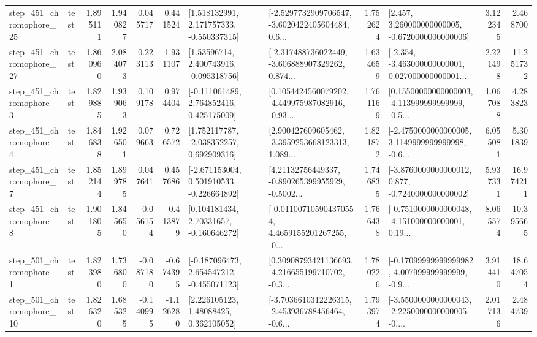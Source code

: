 \begin{tabular}{llrrrrllrlrr}
  step\_451\_chromophore\_25 &      test &      1.895111 &    1.940827 &      0.045717 &  0.441524 &    [1.518132991, 2.171757333, -0.550337315] &  [-2.5297732909706547, -3.6020422405604484, 0.6... &       1.752624 &    [2.457, 3.260000000000005, -0.6720000000000006] &            3.122345 &          2.468700 \\
  step\_451\_chromophore\_27 &      test &      1.860960 &    2.084073 &      0.223113 &  1.931107 &     [1.53596714, 2.400743916, -0.095318756] &  [-2.317488736022449, -3.606888907329262, 0.874... &       1.634659 &  [-2.354, -3.463000000000001, 0.027000000000001... &            2.221498 &         11.251732 \\
   step\_451\_chromophore\_3 &      test &      1.829885 &    1.939063 &      0.109178 &  0.974404 &    [-0.111061489, 2.764852416, 0.425175009] &  [0.1054424560079202, -4.449975987082916, -0.93... &       1.761169 &  [0.15500000000000003, -4.113999999999999, -0.5... &            1.067088 &          4.283823 \\
   step\_451\_chromophore\_4 &      test &      1.846838 &    1.926501 &      0.079663 &  0.726572 &    [1.752117787, -2.038352257, 0.692909316] &  [2.900427609605462, -3.3959253668123313, 1.089... &       1.821872 &  [-2.4750000000000005, 3.1149999999999998, -0.6... &            6.055081 &          5.301839 \\
   step\_451\_chromophore\_7 &      test &      1.852144 &    1.899785 &      0.047641 &  0.457686 &   [-2.671153004, 0.501910533, -0.226664892] &  [4.21132756449337, -0.890265399955929, -0.5002... &       1.746835 &  [-3.8760000000000012, 0.877, -0.7240000000000002] &            5.937331 &         16.974211 \\
   step\_451\_chromophore\_8 &      test &      1.901805 &    1.845650 &     -0.056154 & -0.413879 &     [0.104181434, 2.70331657, -0.160646272] &  [-0.011007105904370554, 4.4659155201267255, -0... &       1.766438 &  [-0.7510000000000048, -4.151000000000001, 0.19... &            8.065574 &         10.395665 \\
   step\_501\_chromophore\_1 &      test &      1.823980 &    1.736800 &     -0.087180 & -0.674395 &   [-0.187096473, 2.654547212, -0.455071123] &  [0.30908793421136693, -4.216655199710702, -0.3... &       1.780226 &  [-0.17099999999999982, 4.007999999999999, -0.9... &            3.914410 &         18.647054 \\
  step\_501\_chromophore\_10 &      test &      1.826320 &    1.685325 &     -0.140995 & -1.126280 &      [2.226105123, 1.48088425, 0.362105052] &  [-3.7036610312226315, -2.453936788456464, -0.6... &       1.793974 &  [-3.5500000000000043, -2.2250000000000005, -0.... &            2.017136 &          2.484739 \\

\end{tabular}
